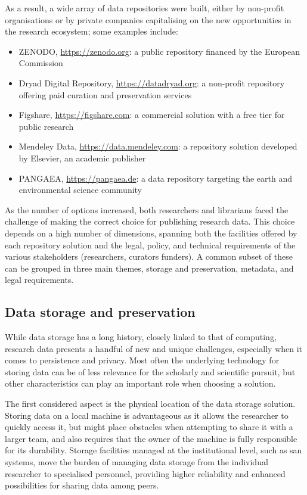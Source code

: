 As a result, a wide array of data repositories were built, either by non-profit organisations or by private companies capitalising on the new opportunities in the research ecosystem; some examples include:
\begin{itemize}
    \item ZENODO, \url{https://zenodo.org}: a public repository financed by the European Commission
    \item Dryad Digital Repository, \url{https://datadryad.org}: a non-profit repository offering paid curation and preservation services
    \item Figshare, \url{https://figshare.com}: a commercial solution with a free tier for public research
    \item Mendeley Data, \url{https://data.mendeley.com}: a repository solution developed by Elsevier, an academic publisher
    \item PANGAEA, \url{https://pangaea.de}: a data repository targeting the earth and environmental science community
\end{itemize}

As the number of options increased, both researchers and librarians faced the challenge of making the correct choice for publishing research data. This choice depends on a high number of dimensions, spanning both the facilities offered by each repository solution and the legal, policy, and technical requirements of the various stakeholders (researchers, curators funders). A common subset of these can be grouped in three main themes, storage and preservation, metadata, and legal requirements.


\subsection{Data storage and preservation}
\label{subsec:storage}

While data storage has a long history, closely linked to that of computing, research data presents a handful of new and unique challenges, especially when it comes to persistence and privacy. Most often the underlying technology for storing data can be of less relevance for the scholarly and scientific pursuit, but other characteristics can play an important role when choosing a solution.

The first considered aspect is the physical location of the data storage solution. Storing data on a local machine is advantageous as it allows the researcher to quickly access it, but might place obstacles when attempting to share it with a larger team, and also requires that the owner of the machine is fully responsible for its durability. Storage facilities managed at the institutional level, such as \gls{san} systems, move the burden of managing data storage from the individual researcher to specialised personnel, providing higher reliability and enhanced possibilities for sharing data among peers.

